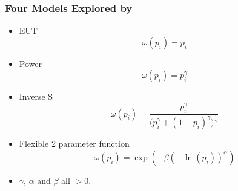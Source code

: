 \documentclass{beamer}
\begin{document}
\begin{frame}
\frametitle{Four Models Explored by \textcite{Harrison2016}}
\begin{itemize}
	\item EUT
		\begin{equation}
			\label{eq4:pw:eut}
			\omega(p_i) = p_i
		\end{equation}
	\item Power \parencite{Quiggin1982}
		\begin{equation}
			\label{eq4:pw:pow}
			\omega(p_i)=p_i^\gamma
		\end{equation}
	\item Inverse S \parencite{Kahneman1979}
		\begin{equation}
			\label{eq4:pw:inv}
			\omega(p_i) = \frac{p_i^\gamma}{\biggl(p_i^\gamma + {(1-p_i)}^\gamma\biggr)^{ \frac{1}{\gamma} } }
		\end{equation}
	\item Flexible 2 parameter function \parencite{Prelec1998}
		\begin{equation}
			\label{eq4:pw:pre}
			\omega(p_i)=\exp(-\beta(-\ln(p_i))^\alpha)
		\end{equation}

	\item $\gamma$, $\alpha$ and $\beta$ all $> 0$.

\end{itemize}
\end{frame}
\end{document}
